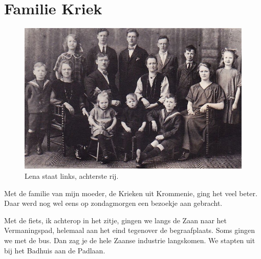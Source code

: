 \documentclass[10pt,twoside, openright]{memoir}
\begin{document}






\section{Familie Kriek} %
\label{cha:familie_kriek}



\begin{figure}
\includegraphics[width=\textwidth]{img/ch3/familie}
\caption*{\footnotesize Lena staat links, achterste rij.}
\end{figure}

Met de familie van mijn moeder, de Krieken uit Krommenie, ging het veel beter. Daar werd nog wel eens op zondagmorgen een bezoekje aan gebracht.   

Met de fiets, ik achterop in het zitje, gingen we langs de Zaan naar het Vermaningspad, helemaal aan het eind tegenover de begraafplaats. Soms gingen we met de bus. Dan zag je de hele Zaanse industrie langskomen. We stapten uit bij het Badhuis aan de Padlaan. 
\end{document}
